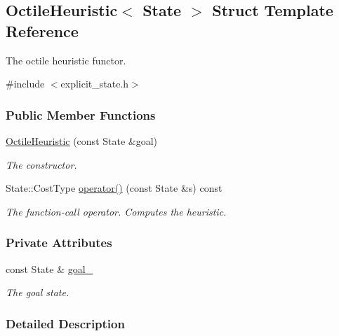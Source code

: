 \hypertarget{structOctileHeuristic}{}\subsection{Octile\+Heuristic$<$ State $>$ Struct Template Reference}
\label{structOctileHeuristic}


The octile heuristic functor.  




{\ttfamily \#include $<$explicit\+\_\+state.\+h$>$}

\subsubsection*{Public Member Functions}
\begin{DoxyCompactItemize}
\item 
\hyperlink{structOctileHeuristic_a3b72f4fd0718b3c6a1bb7d7bc93481ff}{Octile\+Heuristic} (const State \&goal)
\begin{DoxyCompactList}\small\item\em The constructor. \end{DoxyCompactList}\item 
State\+::\+Cost\+Type \hyperlink{structOctileHeuristic_acb4da00e100d0d28e2f506365ea0e01c}{operator()} (const State \&s) const 
\begin{DoxyCompactList}\small\item\em The function-\/call operator. Computes the heuristic. \end{DoxyCompactList}\end{DoxyCompactItemize}
\subsubsection*{Private Attributes}
\begin{DoxyCompactItemize}
\item 
const State \& \hyperlink{structOctileHeuristic_a73f7cd714c87d62155d9751d6b477088}{goal\+\_\+}\hypertarget{structOctileHeuristic_a73f7cd714c87d62155d9751d6b477088}{}\label{structOctileHeuristic_a73f7cd714c87d62155d9751d6b477088}

\begin{DoxyCompactList}\small\item\em The goal state. \end{DoxyCompactList}\end{DoxyCompactItemize}


\subsubsection{Detailed Description}
